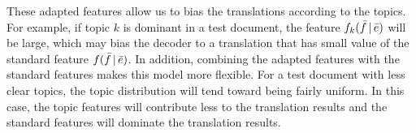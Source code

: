 These adapted features allow us to bias the translations according to
the topics. For example, if topic $k$ is dominant in a test document,
the feature $f_k(\bar{f} \, | \, \bar{e})$ will be large, which may bias the
decoder to a translation that has small value of the standard feature
$f(\bar{f} \, | \, \bar{e})$. In addition, combining the adapted features with
the standard features makes this model more flexible. For a test
document with less clear topics, the topic distribution will tend
toward being fairly uniform. In this case, the topic features will
contribute less to the translation results and the standard features
will dominate the translation results.


%


